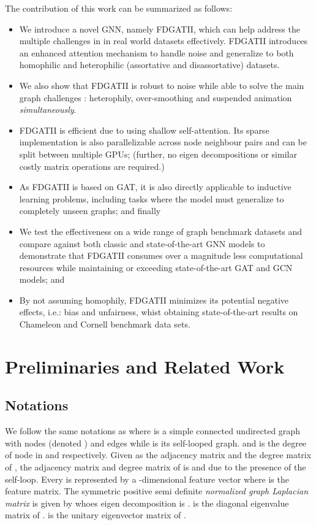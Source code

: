 \documentclass{article}
\begin{document}
The contribution of this work can be summarized as follows:
\begin{itemize}
\item We introduce a novel GNN, namely FDGATII, which can help address the multiple challenges in in real world datasets effectively. FDGATII introduces an enhanced attention mechanism to handle noise and generalize to both homophilic and heterophilic (assortative and disassortative) datasets. 
\item We also show that FDGATII is robust to noise while able to solve the main graph challenges : heterophily, over-smoothing and suspended animation  \textit{simultaneously}. 
\item FDGATII is efficient due to using shallow self-attention. Its sparse implementation is also parallelizable across node neighbour pairs and can be split between multiple GPUs; (further, no eigen decompositions or similar costly matrix operations are required.)
\item As FDGATII is based on GAT, it is also directly applicable to inductive learning problems, including tasks where the model must generalize to completely unseen graphs; and finally
\item We test the effectiveness on a wide range of graph benchmark datasets and compare against both classic and state-of-the-art GNN models to demonstrate that FDGATII consumes over a magnitude less computational resources while maintaining or exceeding state-of-the-art GAT and GCN models; and 
\item By not assuming homophily, FDGATII minimizes its potential negative effects, i.e.: bias and unfairness, whist obtaining state-of-the-art results on Chameleon and Cornell benchmark data sets.
\end{itemize}

\section{Preliminaries and Related Work} \label{Preliminaries}
\subsection{Notations} \label{Notations}
We follow the same notations as \citet{chen2020simple} where  is a simple connected undirected graph with  nodes (denoted ) and  edges while  is its self-looped graph.  and  is the degree of node  in  and  respectively. Given  as the adjacency matrix and  the degree matrix of , the adjacency matrix and degree matrix of  is  and  due to the presence of the self-loop. Every  is represented by a -dimensional feature vector  where  is the  feature matrix. The symmetric positive semi definite \textit{normalized graph Laplacian matrix} is given by  whoes eigen decomposition is .  is the diagonal eigenvalue matrix of .  is the unitary eigenvector matrix of .
\end{document}
